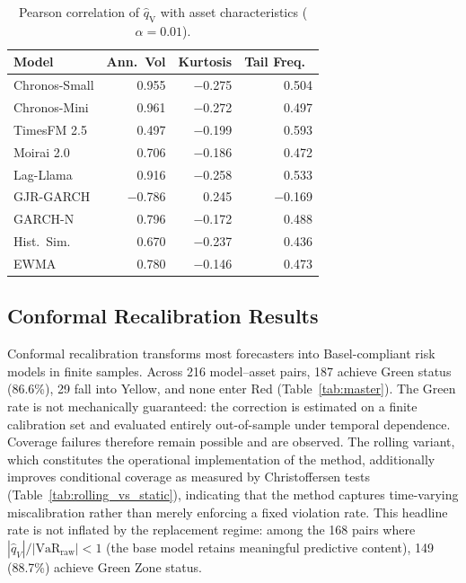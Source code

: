 \documentclass[preprint,11pt,authoryear]{elsarticle}
\newcommand{\1}{\boldsymbol{1}}
\newcommand{\qV}{\hat{q}_{\scriptscriptstyle\mathrm{V}}}
\begin{document}
	\begin{table}[H]
		\centering
		\caption{Pearson correlation of $\qV$ with asset characteristics ($\alpha = 0.01$).}
		\label{tab:cross_sectional}
		\footnotesize
		\begin{tabular}{@{}l rrr@{}}
			\toprule
			Model & Ann.\ Vol & Kurtosis & Tail Freq.\ \\
			\midrule
			Chronos-Small & 0.955 & $-$0.275 & 0.504 \\
			Chronos-Mini & 0.961 & $-$0.272 & 0.497 \\
			TimesFM 2.5 & 0.497 & $-$0.199 & 0.593 \\
			Moirai 2.0 & 0.706 & $-$0.186 & 0.472 \\
			Lag-Llama & 0.916 & $-$0.258 & 0.533 \\
			\midrule
			GJR-GARCH & $-$0.786 & 0.245 & $-$0.169 \\
			GARCH-N & 0.796 & $-$0.172 & 0.488 \\
			Hist.\ Sim. & 0.670 & $-$0.237 & 0.436 \\
			EWMA & 0.780 & $-$0.146 & 0.473 \\
			\bottomrule
		\end{tabular}
	\end{table}
	
	
	\subsection{Conformal Recalibration Results}
	\label{sec:recalib}
	
	Conformal recalibration transforms most forecasters into
	Basel-compliant risk models in finite samples. Across 216 model--asset
	pairs, 187 achieve Green status (86.6\%), 29 fall into Yellow,
	and none enter Red (Table~\ref{tab:master}).
	The Green rate is not mechanically guaranteed: the correction is estimated on a finite calibration set and evaluated entirely out-of-sample under temporal dependence. Coverage failures therefore remain possible and are observed. The rolling variant, which constitutes the operational implementation of the method, additionally improves conditional coverage as measured by Christoffersen tests (Table~\ref{tab:rolling_vs_static}), indicating that the method captures time-varying miscalibration rather than merely enforcing a fixed violation rate.
	This headline rate
	is not inflated by the replacement regime: among the 168 pairs
	where $|\hat{q}_V|/|\mathrm{VaR}_{\mathrm{raw}}| < 1$ (the
	base model retains meaningful predictive content), 149 (88.7\%)
	achieve Green Zone status.
\end{document}
